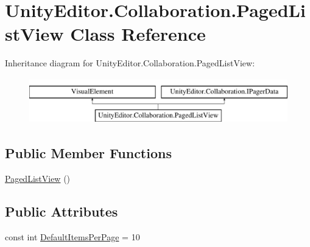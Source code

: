\hypertarget{class_unity_editor_1_1_collaboration_1_1_paged_list_view}{}\section{Unity\+Editor.\+Collaboration.\+Paged\+List\+View Class Reference}
\label{class_unity_editor_1_1_collaboration_1_1_paged_list_view}
Inheritance diagram for Unity\+Editor.\+Collaboration.\+Paged\+List\+View\+:\begin{figure}[H]
\begin{center}
\leavevmode
\includegraphics[height=2.000000cm]{class_unity_editor_1_1_collaboration_1_1_paged_list_view}
\end{center}
\end{figure}
\subsection*{Public Member Functions}
\begin{DoxyCompactItemize}
\item 
\mbox{\hyperlink{class_unity_editor_1_1_collaboration_1_1_paged_list_view_a2b066f74e6330559c44d26dbbb44060e}{Paged\+List\+View}} ()
\end{DoxyCompactItemize}
\subsection*{Public Attributes}
\begin{DoxyCompactItemize}
\item 
const int \mbox{\hyperlink{class_unity_editor_1_1_collaboration_1_1_paged_list_view_a079aa6060c864cee43e86dd1f0ebc7a3}{Default\+Items\+Per\+Page}} = 10
\end{DoxyCompactItemize}
